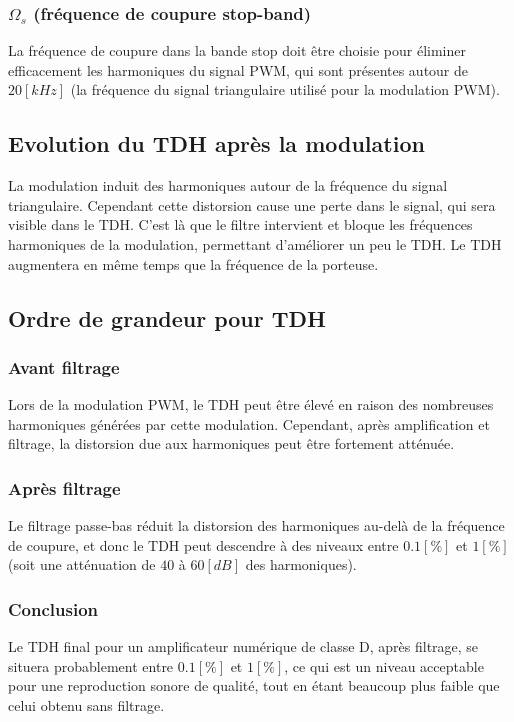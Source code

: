 \documentclass[a4paper,12pt,oneside]{report}	%
\begin{document}
            \subsubsection{$\Omega_s$ (fréquence de coupure stop-band)}
            La fréquence de coupure dans la bande stop doit être choisie pour éliminer efficacement les harmoniques du signal PWM, qui sont présentes autour de $20 [kHz]$ (la fréquence du signal triangulaire utilisé pour la modulation PWM). 
        \subsection{Evolution du TDH après la modulation}
            La modulation induit des harmoniques autour de la fréquence du signal triangulaire. Cependant cette distorsion cause une perte dans le signal, qui sera visible dans le TDH. C'est là que le filtre intervient et bloque les fréquences harmoniques de la modulation, permettant d'améliorer un peu le TDH. Le TDH augmentera en même temps que la fréquence de la porteuse. 
        \subsection{Ordre de grandeur pour TDH}
            \subsubsection{Avant filtrage} Lors de la modulation PWM, le TDH peut être élevé en raison des nombreuses harmoniques générées par cette modulation. Cependant, après amplification et filtrage, la distorsion due aux harmoniques peut être fortement atténuée.
            \subsubsection{Après filtrage} Le filtrage passe-bas réduit la distorsion des harmoniques au-delà de la fréquence de coupure, et donc le TDH peut descendre à des niveaux entre $0.1[\%]$ et $1[\%]$ (soit une atténuation de $40$ à $60 [dB]$ des harmoniques).
            \subsubsection{Conclusion} Le TDH final pour un amplificateur numérique de classe D, après filtrage, se situera probablement entre $0.1[\%]$ et $1[\%]$, ce qui est un niveau acceptable pour une reproduction sonore de qualité, tout en étant beaucoup plus faible que celui obtenu sans filtrage.
\newpage
\end{document}
